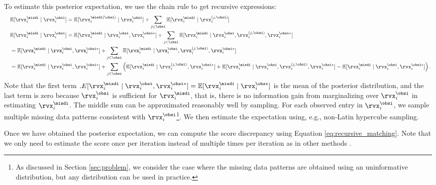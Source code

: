 To estimate this posterior expectation, we use the chain rule to get recursive expressions:
\begin{align}
	& \quad \mathbb{E}[\rvx_{i}^{\misdi} \mid \rvx_{i}^{\obsi} ] = \mathbb{E}[\rvx_{i}^{\misdi(\obsi)} \mid \rvx_{i}^{\obsi}] + \sum_{j \in \obsi} \mathbb{E}[\rvx_{i}^{\misdi} \mid \rvx_{i}^{(j, \obsi)}] \label{eq:recursive_matching_posterior_expectation} \\ 
	&\quad \mathbb{E}[\rvx_{i}^{\misdi} \mid \rvx_{i}^{\obsi}] = \mathbb{E}[\rvx_{i}^{\misdi} \mid \rvx_{i}^{\obsi}, \rvx_{i}^{\obsi*} ] + \sum_{j \in \obsi} \mathbb{E}[\rvx_{i}^{\misdi} \mid \rvx_{i}^{\obsi}, \rvx_{i}^{(j, \obsi)},  \rvx_{i}^{\obsi*} ] \notag \\
    &\quad = \mathbb{E}[\rvx_{i}^{\misdi} \mid \rvx_{i}^{\obsi}, \rvx_{i}^{\obsi*} ] + \sum_{j \in \obsi}  \mathbb{E}[\rvx_{i}^{\misdi} \mid \rvx_{i}^{\obsi}, \rvx_{i}^{(j, \obsi)},  \rvx_{i}^{\obsi*} ] \notag \\
	&\quad = \mathbb{E}[\rvx_{i}^{\misdi} \mid \rvx_{i}^{\obsi}, \rvx_{i}^{\obsi*} ] + \sum_{j \in \obsi}  \left( \mathbb{E}[\rvx_{i}^{\misdi} \mid \rvx_{i}^{(j, \obsi)},  \rvx_{i}^{\obsi*} ] + \mathbb{E}[\rvx_{i}^{\misdi} \mid \rvx_{i}^{\obsi}, \rvx_{i}^{(j, \obsi)},  \rvx_{i}^{\obsi*} ] - \mathbb{E}[\rvx_{i}^{\misdi} \mid \rvx_{i}^{\obsi},  \rvx_{i}^{\obsi*} ] \right). \notag
\end{align}
Note that the first term $\mathbb.E[\rvx_{i}^{\misdi} \mid \rvx_{i}^{\obsi}, \rvx_{i}^{\obsi*} ] = \mathbb{E}[\rvx_{i}^{\misdi} \mid \rvx_{i}^{\obsi}]$ is the mean of the posterior distribution, and the last term is zero because $\rvx_{i}^{\obsi}$ is sufficient for $\rvx_{i}^{\misdi}$, that is, there is no information gain from marginalizing over $\rvx_{i}^{\obsi}$ in estimating $\rvx_{i}^{\misdi}$. The middle sum can be approximated reasonably well by sampling. For each observed entry in $\rvx_{i}^{\obsi}$, we sample multiple missing data patterns consistent with $\rvx_{i}^{\obsi}$\footnote{As discussed in Section \ref{sec:problem}, we consider the case where the missing data patterns are obtained using an uninformative distribution, but any distribution can be used in practice.}. We then estimate the expectation using, e.g., non-Latin hypercube sampling.

Once we have obtained the posterior expectation, we can compute the score discrepancy using Equation \eqref{eq:recursive_matching}. Note that we only need to estimate the score once per iteration instead of multiple times per iteration as in other methods \citep{Uehara2020, Zheng2022}.

